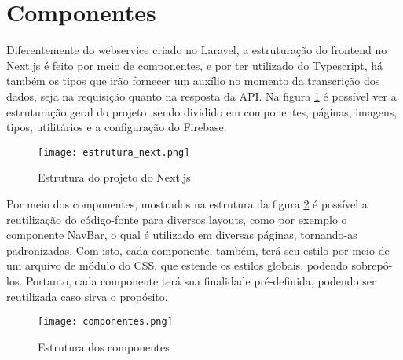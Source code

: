 \section{Componentes}
Diferentemente do webservice criado no Laravel, a estruturação do frontend no Next.js é feito por meio de componentes, e por ter utilizado do Typescript, há também os tipos que irão fornecer um auxílio no momento da transcrição dos dados, seja na requisição quanto na resposta da API. Na figura \ref{estrutura_next} é possível ver a estruturação geral do projeto, sendo dividido em componentes, páginas, imagens, tipos, utilitários e a configuração do Firebase.
\begin{figure}[H]
    \caption{\label{estrutura_next}Estrutura do projeto do Next.js}
    \vspace{5pt}
    \centering
    \texttt{[image: estrutura\_next.png]}
    \vspace{5pt}
\end{figure}

Por meio dos componentes, mostrados na estrutura da figura \ref{componentes} é possível a reutilização do código-fonte para diversos layouts, como por exemplo o componente NavBar, o qual é utilizado em diversas páginas, tornando-as padronizadas. Com isto, cada componente, também, terá seu estilo por meio de um arquivo de módulo do CSS, que estende os estilos globais, podendo sobrepô-los. Portanto, cada componente terá sua finalidade pré-definida, podendo ser reutilizada caso sirva o propósito.

\begin{figure}[H]
    \caption{\label{componentes}Estrutura dos componentes}
    \vspace{5pt}
    \centering
    \texttt{[image: componentes.png]}
    \vspace{5pt}
\end{figure}

